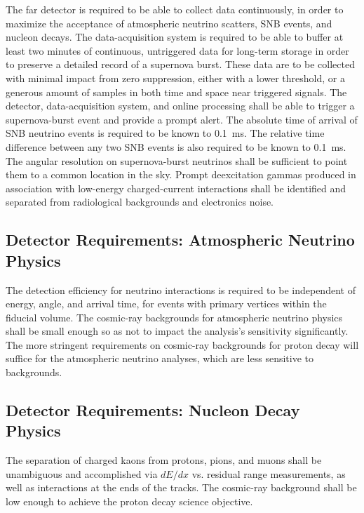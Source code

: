 The far detector is required to be able to collect data continuously,
in order to maximize the acceptance of atmospheric neutrino scatters,
SNB events, and nucleon decays.  The data-acquisition system is
required to be able to buffer at least two minutes of continuous, 
untriggered data for long-term storage in order to preserve a detailed
record of a supernova burst.  These data are to be collected with minimal impact
from zero suppression, either with a lower threshold, or a generous amount of samples
in both time and space near triggered signals. The detector, data-acquisition system, and
online processing shall be able to trigger a supernova-burst event and
provide a prompt alert. The absolute time of arrival of SNB
neutrino events is required to be known to 0.1~ms.  The relative time
difference between any two SNB events is also required to be known to
0.1~ms.  The angular resolution on supernova-burst neutrinos shall be
sufficient to point them to a common location in the sky.  Prompt deexcitation
gammas produced in association with low-energy charged-current interactions
shall be identified and separated from radiological backgrounds and electronics noise.

\subsection{Detector Requirements: Atmospheric Neutrino Physics}

The detection efficiency for neutrino interactions is required to be
independent of energy, angle, and arrival time, for events with
primary vertices within the fiducial volume.  The cosmic-ray backgrounds
for atmospheric neutrino physics shall be small enough so as not to impact
the analysis's sensitivity significantly.  The more stringent requirements
on cosmic-ray backgrounds for proton decay will suffice for the atmospheric
neutrino analyses, which are less sensitive to backgrounds.

\subsection{Detector Requirements: Nucleon Decay Physics}

The separation of charged kaons from protons, pions, and muons shall be unambiguous
and accomplished
via $dE/dx$ vs. residual range measurements, as well as interactions at the
ends of the tracks.  The cosmic-ray background shall be low enough to achieve the
proton decay science objective.  

